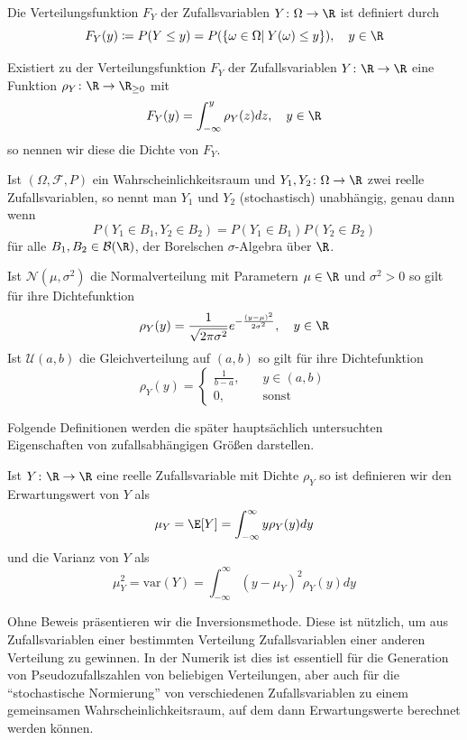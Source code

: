 \begin{mathdef}[Verteilungsfunktion]
Die Verteilungsfunktion $F_Y$ der Zufallsvariablen $Y\colon\Omega\to\R$ ist definiert durch
\[F_Y(y)\coloneqq P(Y\le y)=P(\left\lbrace \omega\in\Omega |\: Y(\omega)\le y\right\rbrace),\quad y\in\R\]
\end{mathdef}
\begin{mathdef}
Existiert zu der Verteilungsfunktion $F_Y$ der Zufallsvariablen $Y\colon\R\to\R$ eine Funktion $\rho_Y\colon\R\to\R_{\ge 0}$ mit
\[F_Y(y)=\int_{-\infty}^y\rho_Y(z)dz,\quad y\in\R\]
so nennen wir diese die Dichte von $F_Y$.
\end{mathdef}
\begin{mathdef}
Ist $(\Omega,\mathcal{F},P)$ ein Wahrscheinlichkeitsraum und $Y_1, Y_2\colon \Omega\to\R$ zwei reelle Zufallsvariablen, so nennt man $Y_1$ und $Y_2$ (stochastisch) unabhängig, genau dann wenn
\[P(Y_1\in B_1,Y_2\in B_2)=P(Y_1\in B_1)P(Y_2\in B_2)\]
für alle $B_1,B_2\in \mathcal{B}(\R)$, der Borelschen $\sigma$-Algebra über $\R$.
\end{mathdef}
\begin{mathbsp}
Ist $\mathcal{N}(\mu, \sigma^2)$ die Normalverteilung mit Parametern $\mu\in\R$ und $\sigma^2>0$ so gilt für ihre Dichtefunktion
\[\rho_Y(y)=\frac{1}{\sqrt{2\pi\sigma^2}}e^{-\frac{(y-\mu)^2}{2\sigma^2}},\quad y\in\R\]
Ist $\mathcal{U}(a,b)$ die Gleichverteilung auf $(a,b)$ so gilt für ihre Dichtefunktion
\[\rho_Y(y)=\begin{cases}\frac{1}{b-a},\quad &y\in (a,b)\\ 0, \quad &\text{sonst} \end{cases}\]
\end{mathbsp}
Folgende Definitionen werden die später hauptsächlich untersuchten Eigenschaften von zufallsabhängigen Größen darstellen.
\begin{mathdef}
Ist $Y\colon\R\to\R$ eine reelle Zufallsvariable mit Dichte $\rho_Y$ so ist definieren wir den Erwartungswert von $Y$ als
\[\mu_Y=\E[Y]=\int_{-\infty}^\infty y\rho_Y(y)dy\]
und die Varianz von $Y$ als 
\[\mu_Y^2=\text{var}(Y)=\int_{-\infty}^\infty (y-\mu_Y)^2\rho_Y(y)dy\]
\end{mathdef}
Ohne Beweis präsentieren wir die Inversionsmethode. Diese ist nützlich, um aus Zufallsvariablen einer bestimmten Verteilung Zufallsvariablen einer anderen Verteilung zu gewinnen. In der Numerik ist dies ist essentiell für die Generation von Pseudozufallszahlen von beliebigen Verteilungen, aber auch für die "`stochastische Normierung"' von verschiedenen Zufallsvariablen zu einem gemeinsamen Wahrscheinlichkeitsraum, auf dem dann Erwartungswerte berechnet werden können.
